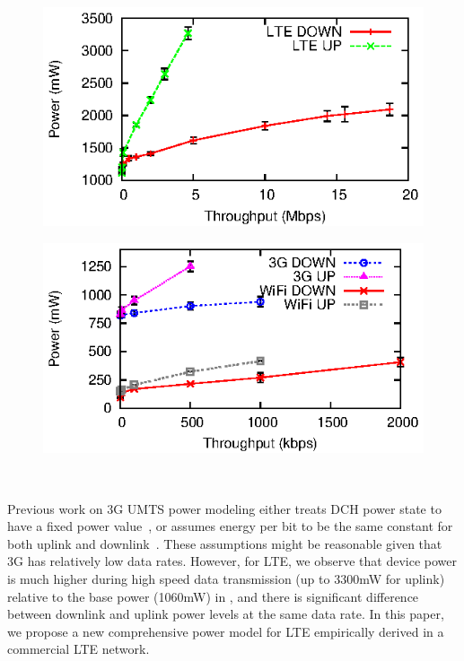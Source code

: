\begin{figure}[tp]
\centering
\begin{minipage}[b]{.49\textwidth}
\centering
\includegraphics[width=.99\textwidth]{figures/mobisys12/power_tp.eps}
\label{fig:power.tp}
\end{minipage}
\begin{minipage}[b]{.49\textwidth}
\centering
\includegraphics[width=.99\textwidth]{figures/mobisys12/power_tp2.eps}
\label{fig:power.tp2}
\end{minipage}
\end{figure}

\begin{figure}[t]
\centering
{} \\
\label{fig:up.down}
\end{figure}



\label{sec:power.updown}
Previous work on 3G UMTS power modeling either treats DCH power state to have a fixed power value~\cite{codes.powertutor, mobisys.aro}, or assumes energy per bit to be the same constant for both uplink and downlink~\cite{imc.tailender}. These assumptions might be reasonable given that 3G has relatively low data rates. However, for LTE, we observe that device power is much higher during high speed data transmission (up to 3300mW for uplink) relative to the base power (1060mW) in \RC, and there is significant difference between downlink and uplink power levels at the same data rate. In this paper, we propose a new comprehensive power model for LTE empirically derived in a commercial LTE network.


